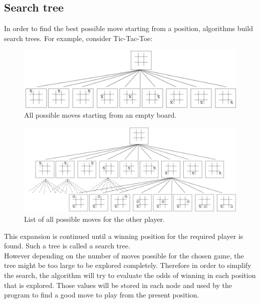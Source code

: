 \subsection{Search tree}
\label{trees}
In order to find the best possible move starting from a position, algorithms build search trees. 
For example, consider Tic-Tac-Toe: \cite{images_annexes}
\begin{figure}[H]
	\centering
	\includegraphics[width=15cm]{3Algorithms/3.1Trees_Benoit/img/Tree1.png}
	\caption{\label{fig:tree1}All possible moves starting from an empty board.}
\end{figure}
\noindent
\begin{figure}[H]
	\centering
	\includegraphics[width=15cm]{3Algorithms/3.1Trees_Benoit/img/Tree2.png}
	\caption{\label{fig:tree2}List of all possible moves for the other player.}
\end{figure}

This expansion is continued until a winning position for the required player is found. Such a tree is called a search tree.
\bigskip\\
However depending on the number of moves possible for the chosen game, the tree might be too large to be explored completely. Therefore in order to simplify the search, the algorithm will try to evaluate the odds of winning in each position that is explored. Those values will be stored in each node and used by the program to find a good move to play from the present position.